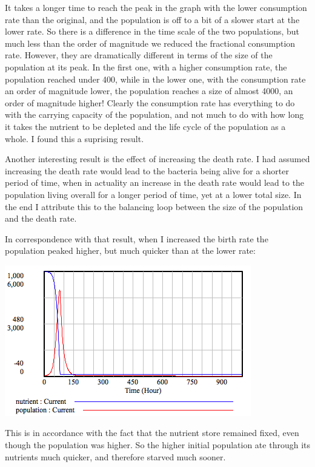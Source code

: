 \documentclass[12pt]{article}
\begin{document}
It takes a longer time to reach the peak in the graph with the lower consumption rate than the original, and the population is off to a bit of a slower start at the lower rate.  So there is a difference in the time scale of the two populations, but much less than the order of magnitude we reduced the fractional consumption rate.  However, they are dramatically different in terms of the size of the population at its peak.  In the first one, with a higher consumption rate, the population reached under 400, while in the lower one, with the consumption rate an order of magnitude lower, the population reaches a size of almost 4000, an order of magnitude higher!  Clearly the consumption rate has everything to do with the carrying capacity of the population, and not much to do with how long it takes the nutrient to be depleted and the life cycle of the population as a whole.  I found this a suprising result.  

Another interesting result is the effect of increasing the death rate.  I had assumed increasing the death rate would lead to the bacteria being alive for a shorter period of time, when in actuality an increase in the death rate would lead to the population living overall for a longer period of time, yet at a lower total size.  In the end I attribute this to the balancing loop between the size of the population and the death rate.  

In correspondence with that result, when I increased the birth rate the population peaked higher, but much quicker than at the lower rate:  


\includegraphics[scale=0.72]{highbirthrate.png}

This is in accordance with the fact that the nutrient store remained fixed, even though the population was higher.  So the higher initial population ate through its nutrients much quicker, and therefore starved much sooner.  
\end{document}
